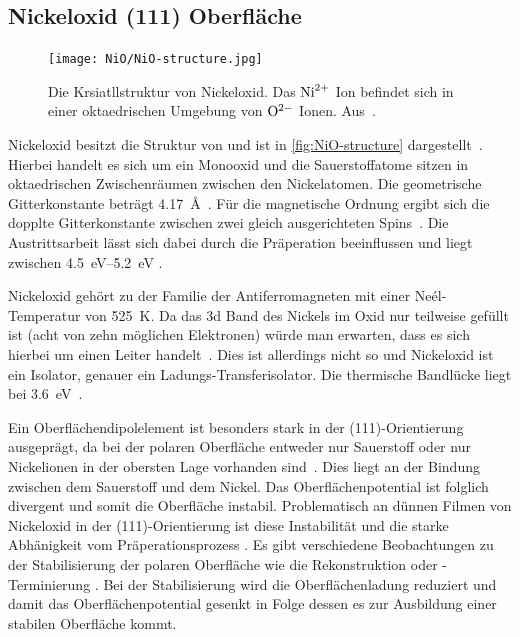         \subsection{Nickeloxid (111) Oberfläche}
            \begin{figure}
                \centering
                \texttt{[image: NiO/NiO-structure.jpg]}
                \caption{Die Krsiatllstruktur von Nickeloxid. Das $\ce{Ni}^{2+}$ Ion befindet sich in einer oktaedrischen Umgebung von $\ce{O}^{2-}$ Ionen. Aus~\cite{NiO-structure}.}
                \label{fig:NiO-structure}
            \end{figure}
            Nickeloxid besitzt die Struktur von  und ist in \autoref{fig:NiO-structure} dargestellt~\cite{kunz_chemisorption_1985}.
            Hierbei handelt es sich um ein Monooxid und die Sauerstoffatome sitzen in oktaedrischen Zwischenräumen zwischen den Nickelatomen.
            Die geometrische Gitterkonstante beträgt \SI{4.17}{\angstrom}~\cite{sebbari_uranyl_2012}.
            Für die magnetische Ordnung ergibt sich die dopplte Gitterkonstante zwischen zwei gleich ausgerichteten Spins~\cite{Suter}.
            Die Austrittsarbeit lässt sich dabei durch die Präperation beeinflussen und liegt zwischen \SIrange[range-phrase=' und ']{4.5}{5.2}{\electronvolt} \cite{poulain_electronic_2020}.

            Nickeloxid gehört zu der Familie der Antiferromagneten mit einer Neél-Temperatur von \SI{525}{\kelvin}.
            Da das 3d Band des Nickels im Oxid nur teilweise gefüllt ist (acht von zehn möglichen Elektronen) würde man erwarten, dass es sich hierbei um einen Leiter handelt~\cite{kunz_chemisorption_1985}.
            Dies ist allerdings nicht so und Nickeloxid ist ein Isolator, genauer ein Ladungs-Transferisolator.
            Die thermische Bandlücke liegt bei \SI{3.6}{\electronvolt}~\cite{kunz_chemisorption_1985}.

            Ein Oberflächendipolelement ist besonders stark in der (111)-Orientierung ausgeprägt, da bei der polaren Oberfläche entweder nur Sauerstoff oder nur Nickelionen in der obersten Lage vorhanden sind~\cite{NiO_8}.
            Dies liegt an der Bindung zwischen dem Sauerstoff und dem Nickel.
            Das Oberflächenpotential ist folglich divergent und somit die Oberfläche instabil.
            Problematisch an dünnen Filmen von Nickeloxid in der (111)-Orientierung ist diese Instabilität und die starke Abhänigkeit vom Präperationsprozess \cite{NiO_36}.
            Es gibt verschiedene Beobachtungen zu der Stabilisierung der polaren Oberfläche wie die Rekonstruktion oder -Terminierung \cite{NiO_36, NiO_35, NiO_34, NiO_27, NiO_10}.
            Bei der Stabilisierung wird die Oberflächenladung reduziert und damit das Oberflächenpotential gesenkt in Folge dessen es zur Ausbildung einer stabilen Oberfläche kommt.

